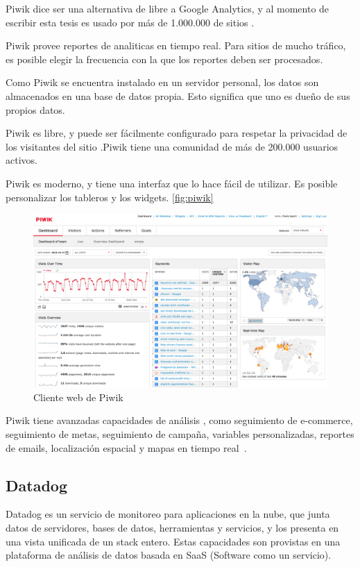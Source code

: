 Piwik dice ser una alternativa de  libre a Google Analytics, y al
momento de escribir esta tesis es usado por más de 1.000.000 de sitios .

Piwik provee reportes de analiticas  en tiempo real. Para sitios  de
mucho tráfico, es posible elegir la frecuencia con la que los reportes deben
ser procesados.

Como Piwik se encuentra instalado en un servidor personal, los datos son
almacenados en una base de datos propia. Esto significa que uno es dueño de sus
propios datos.

Piwik es  libre, y puede ser fácilmente configurado para respetar la
privacidad de los visitantes del sitio .Piwik tiene una comunidad de más de
200.000 usuarios activos.

Piwik es moderno, y tiene una interfaz que lo hace fácil de utilizar. Es
posible personalizar los tableros y los widgets. \autoref{fig:piwik}

\begin{figure}
  \includegraphics[width=\linewidth]{src/images/anexos/piwik.png}
  \caption{Cliente web de Piwik}
  \label{fig:piwik}
\end{figure}

Piwik tiene avanzadas capacidades de análisis , como seguimiento de
e-commerce, seguimiento de metas, seguimiento de campaña, variables
personalizadas, reportes de emails, localización espacial y mapas en tiempo
real~\cite{piwik}.

\subsection{Datadog}

Datadog es un servicio de monitoreo para aplicaciones en la nube, que junta
datos de servidores, bases de datos, herramientas y servicios, y los presenta
en una vista unificada de un stack entero. Estas capacidades son provistas en
una plataforma de análisis de datos  basada en SaaS (Software como un
servicio).

